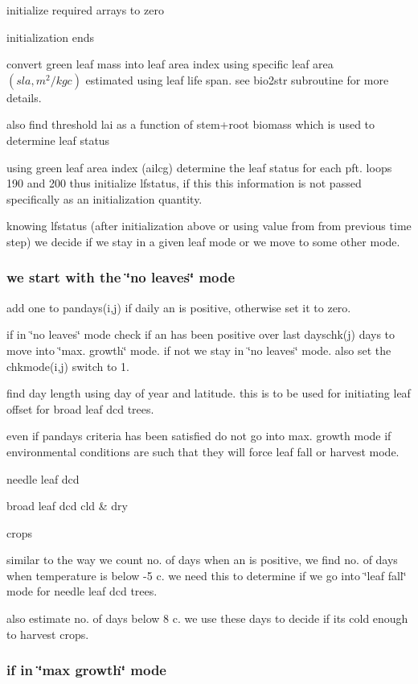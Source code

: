 initialize required arrays to zero

initialization ends 



convert green leaf mass into leaf area index using specific leaf area $(sla, m^2 /kg c)$ estimated using leaf life span. see bio2str subroutine for more details.

also find threshold lai as a function of stem+root biomass which is used to determine leaf status

using green leaf area index (ailcg) determine the leaf status for each pft. loops 190 and 200 thus initialize lfstatus, if this this information is not passed specifically as an initialization quantity.

knowing lfstatus (after initialization above or using value from from previous time step) we decide if we stay in a given leaf mode or we move to some other mode.

\subsubsection*{we start with the \char`\"{}no leaves\char`\"{} mode }

add one to pandays(i,j) if daily an is positive, otherwise set it to zero.

if in \char`\"{}no leaves\char`\"{} mode check if an has been positive over last dayschk(j) days to move into \char`\"{}max. growth\char`\"{} mode. if not we stay in \char`\"{}no leaves\char`\"{} mode. also set the chkmode(i,j) switch to 1.

find day length using day of year and latitude. this is to be used for initiating leaf offset for broad leaf dcd trees.

even if pandays criteria has been satisfied do not go into max. growth mode if environmental conditions are such that they will force leaf fall or harvest mode.

needle leaf dcd

broad leaf dcd cld \& dry

crops

similar to the way we count no. of days when an is positive, we find no. of days when temperature is below -\/5 c. we need this to determine if we go into \char`\"{}leaf fall\char`\"{} mode for needle leaf dcd trees.

also estimate no. of days below 8 c. we use these days to decide if its cold enough to harvest crops.

\subsubsection*{if in \char`\"{}max growth\char`\"{} mode }

